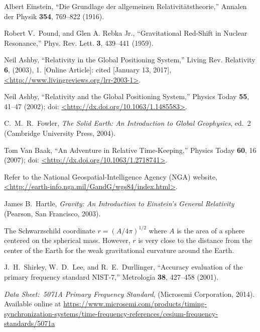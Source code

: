 \documentclass[prb,preprint]{revtex4-1}
\begin{document}
\begin{thebibliography}{99}
 Albert Einstein, ``Die Grundlage der allgemeinen Relativit{\"a}tstheorie,'' Annalen der Physik \textbf{354}, 769--822 (1916).

 Robert V.\ Pound, and Glen A. Rebka Jr., ``Gravitational Red-Shift in Nuclear Resonance,'' Phys. Rev. Lett. \textbf{3}, 439--441 (1959).

 Neil Ashby, ``Relativity in the Global Positioning System,''
Living Rev. Relativity \textbf{6}, (2003), 1. [Online Article]: cited [January 13, 2017],
\url{<http://www.livingreviews.org/lrr-2003-1>}.

 Neil Ashby, ``Relativity and the Global Positioning System,'' Physics Today \textbf{55}, 41--47 (2002); doi: \url{<http://dx.doi.org/10.1063/1.1485583>}.

 C.\ M.\ R.\ Fowler, \textit{The Solid Earth: An Introduction to Global Geophysics}, ed.\ 2 (Cambridge University Press, 2004).

 Tom Van Baak, ``An Adventure in Relative Time-Keeping,'' Physics Today \textbf{60}, 16 (2007); doi: \url{<http://dx.doi.org/10.1063/1.2718741>}.

 Refer to the National Geospatial-Intelligence Agency (NGA) website, \url{<http://earth-info.nga.mil/GandG/wgs84/index.html>}. 

 James B.\ Hartle, \textit{Gravity: An Introduction to Einstein's General Relativity} (Pearson, San Francisco, 2003).

 The Schwarzschild coordinate $r = (A/4\pi)^{1/2}$ where $A$ is the area of a sphere centered on the spherical mass. However, $r$ is very close to the distance from the center of the Earth for the weak gravitational curvature around the Earth.

 J.\ H.\ Shirley, W.\ D.\ Lee, and R.\ E.\ Durllinger, ``Accuracy evaluation of the primary frequency standard NIST-7,'' Metrologia \textbf{38}, 427--458 (2001).

 \textit{Data Sheet:\ 5071A Primary Frequency Standard}, (Microsemi Corporation, 2014). Available online at \url{https://www.microsemi.com/products/timing-synchronization-systems/time-frequency-references/cesium-frequency-standards/5071a}

\end{thebibliography}
\end{document}
